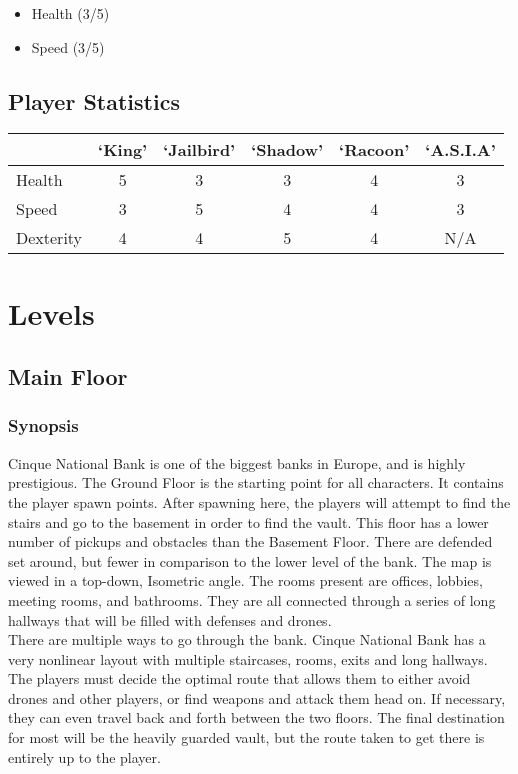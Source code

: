\documentclass[10pt]{report}
\begin{document}
\begin{itemize}
    \item Health (3/5)
    \item Speed (3/5)
\end{itemize}

\section{Player Statistics}

\begin{center}
    \begin{tabular}{|l|c|c|c|c|c|}
        \hline
                    & `King'        & `Jailbird'    & `Shadow'      & `Racoon'      & `A.S.I.A' \\ \hline
        Health      &  5            & 3             & 3             & 4             & 3         \\ \hline
        Speed       &  3            & 5             & 4             & 4             & 3         \\ \hline
        Dexterity   &  4            & 4             & 5             & 4             & N/A       \\ \hline
    \end{tabular}
\end{center}

\chapter{Levels}

\section{Main Floor}

\subsection{Synopsis}

Cinque National Bank is one of the biggest banks in Europe, and is highly prestigious. The Ground Floor is the starting point for all characters. It contains the player spawn points. After spawning here, the players will attempt to find the stairs and go to the basement in order to find the vault. This floor has a lower number of pickups and obstacles than the Basement Floor. There are defended set around, but fewer in comparison to the lower level of the bank. The map is viewed in a top-down, Isometric angle. The rooms present are offices, lobbies, meeting rooms, and bathrooms. They are all connected through a series of long hallways that will be filled with defenses and drones.\\
There are multiple ways to go through the bank. Cinque National Bank has a very nonlinear layout with multiple staircases, rooms, exits and long hallways. The players must decide the optimal route that allows them to either avoid drones and other players, or find weapons and attack them head on. If necessary, they can even travel back and forth between the two floors. The final destination for most will be the heavily guarded vault, but the route taken to get there is entirely up to the player. 
\end{document}

